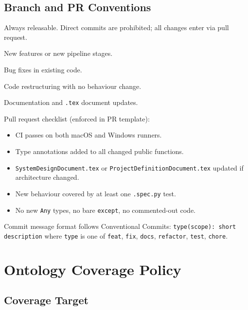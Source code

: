 \documentclass[12pt]{article}
\newcommand{\code}[1]{\texttt{#1}}
\begin{document}
\subsection{Branch and PR Conventions}

\begin{description}[style=nextline, leftmargin=3cm]
\item[\code{main}] Always releasable. Direct commits are prohibited; all changes enter via pull request.
\item[\code{feat/*}] New features or new pipeline stages.
\item[\code{fix/*}] Bug fixes in existing code.
\item[\code{refactor/*}] Code restructuring with no behaviour change.
\item[\code{docs/*}] Documentation and \code{.tex} document updates.
\end{description}

Pull request checklist (enforced in PR template):
\begin{itemize}
\item CI passes on both macOS and Windows runners.
\item Type annotations added to all changed public functions.
\item \code{SystemDesignDocument.tex} or \code{ProjectDefinitionDocument.tex} updated if architecture changed.
\item New behaviour covered by at least one \code{.spec.py} test.
\item No new \code{Any} types, no bare \code{except}, no commented-out code.
\end{itemize}

Commit message format follows Conventional Commits:
\code{type(scope): short description} where \code{type} is one of \code{feat}, \code{fix}, \code{docs}, \code{refactor}, \code{test}, \code{chore}.


\section{Ontology Coverage Policy}
\label{sec:ontology-coverage}

\subsection{Coverage Target}
\end{document}
